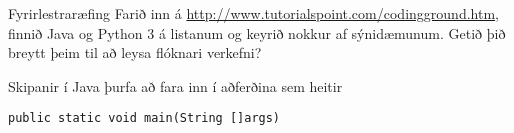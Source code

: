 \documentclass{beamer}
\begin{document}
\begin{frame}[fragile]{Fyrirlestraræfing}
Farið inn á \url{http://www.tutorialspoint.com/codingground.htm}, finnið Java og Python 3 á listanum og keyrið nokkur af sýnidæmunum. Getið þið breytt þeim til að leysa flóknari verkefni?

\vspace{1cm}
Skipanir í Java þurfa að fara inn í aðferðina sem heitir
\begin{verbatim}
public static void main(String []args)
\end{verbatim}
\end{frame}
\end{document}
